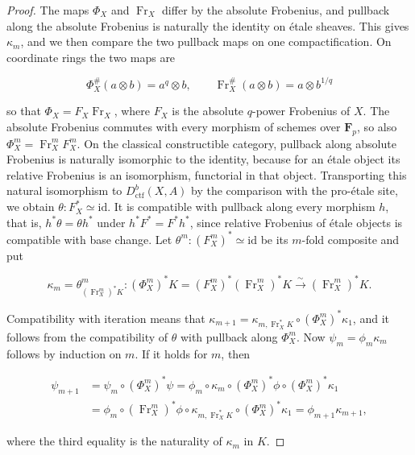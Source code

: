 \documentclass[11pt]{article}
\begin{document}
\begin{proof}[{Proof}]\label{bp10}%
The maps \(\Phi_X\) and \(\operatorname{Fr}_X\) differ by the absolute Frobenius, and pullback along the absolute Frobenius is naturally the identity on étale sheaves. This gives \(\kappa_m\), and we then compare the two pullback maps on one compactification. On coordinate rings the two maps are

\[
\Phi_X^\#(a\otimes b)=a^q\otimes b,
\qquad \operatorname{Fr}_X^\#(a\otimes b)=a\otimes b^{1/q}
\]

so that \(\Phi_X=F_X\operatorname{Fr}_X\), where \(F_X\) is the absolute \(q\)-power Frobenius of \(X\). The absolute Frobenius commutes with every morphism of schemes over \(\mathbf F_p\), so also \(\Phi_X^m=\operatorname{Fr}_X^mF_X^m\). On the classical constructible category, pullback along absolute Frobenius is naturally isomorphic to the identity, because for an étale object its relative Frobenius is an isomorphism, functorial in that object. Transporting this natural isomorphism to \(D^b_{\mathrm{ctf}}(X,A)\) by the comparison with the pro-étale site, we obtain \(\theta:F_X^*\simeq\mathrm{id}\). It is compatible with pullback along every morphism \(h\), that is, \(h^*\theta=\theta h^*\) under \(h^*F^*=F^*h^*\), since relative Frobenius of étale objects is compatible with base change. Let \(\theta^m:(F_X^m)^*\simeq\mathrm{id}\) be its \(m\)-fold composite and put

\[
\kappa_m=\theta^m_{(\operatorname{Fr}_X^m)^*K}:
(\Phi_X^m)^*K=(F_X^m)^*(\operatorname{Fr}_X^m)^*K
\xrightarrow{\sim}(\operatorname{Fr}_X^m)^*K .
\]

Compatibility with iteration means that \(\kappa_{m+1}=\kappa_{m,\operatorname{Fr}_X^*K}\circ(\Phi_X^m)^*\kappa_1\), and it follows from the compatibility of \(\theta\) with pullback along \(\Phi_X^m\). Now \(\psi_m=\phi_m\kappa_m\) follows by induction on \(m\). If it holds for \(m\), then

\[
\begin{aligned}
\psi_{m+1}&=\psi_m\circ(\Phi_X^m)^*\psi
=\phi_m\circ\kappa_m\circ(\Phi_X^m)^*\phi\circ(\Phi_X^m)^*\kappa_1\\
&=\phi_m\circ(\operatorname{Fr}_X^m)^*\phi\circ\kappa_{m,\operatorname{Fr}_X^*K}\circ(\Phi_X^m)^*\kappa_1
=\phi_{m+1}\kappa_{m+1},
\end{aligned}
\]

where the third equality is the naturality of \(\kappa_m\) in \(K\).


\end{proof}
\end{document}

